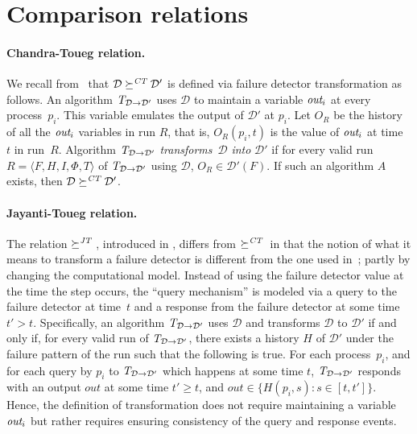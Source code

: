 \documentclass[11pt]{article}
\newcommand{\ident}[1]{\textit{#1}\rule{0cm}{1ex}}
\newcommand{\D}{\mathcal{D}}
\newcommand{\Trans}[1]{\ident{T}_{#1}}
\newcommand{\redCT}{\succeq^\ident{CT}}
\newcommand{\redJT}{\succeq^\ident{JT}}
\begin{document}
\section{Comparison relations}\label{sec:comparisonRelations}

\paragraph{Chandra-Toueg relation.}  

We recall from~\cite{chan:ufdfr,chan:twfdf1} that $\D\redCT\D'$ is
     defined via failure detector transformation as follows.
An  algorithm $\Trans{\D\rightarrow\D'}$ uses $\D$ to maintain a
     variable $\ident{out}_i$ at every process~$p_i$.
This variable emulates the output of $\D'$ at $p_i$.
Let $O_R$ be the history of all the $\ident{out}_i$ variables in run
     $R$, that is, $O_R(p_i,t)$ is the value of $\ident{out}_i$ at
     time~$t$ in run~$R$.
Algorithm $\Trans{\D\rightarrow\D'}$ \emph{transforms}~$\D$
     \emph{into} $\D'$ if for every valid run $R=\langle F, H , I,
     \Phi, T \rangle$ of $\Trans{\D\rightarrow\D'}$ using $\D$,
     $O_R\in \D'(F)$.
If such an algorithm $A$ exists, then $\D\redCT\D'$.

\paragraph{Jayanti-Toueg relation.}  

The relation $\redJT$, introduced in \cite{jayanti:ephawfd}, differs
     from $\redCT$ in that the notion of what it means to transform a
     failure detector is different from the one used
     in~\cite{chan:ufdfr}; partly by changing the computational model.
Instead of using the failure detector value at the time the step
     occurs, the ``query mechanism'' is modeled via a query to the
     failure detector at time~$t$ and a response from the failure
     detector at some time $t'>t$.
Specifically, an algorithm $\Trans{\D\rightarrow\D'}$ uses $\D$ and
     transforms $\D$ to $\D'$ if and only if, for every valid run of
     $\Trans{\D\rightarrow\D'}$, there exists a history $H$ of $\D'$
     under the failure pattern of the run such that the following is
     true.
For each process~$p_i$, and for each query by $p_i$ to
     $\Trans{\D\rightarrow\D'}$ which happens at some time $t$,
     $\Trans{\D\rightarrow\D'}$ responds with an output $out$ at some
     time $t'\geq t$, and $out \in \{H(p_i,s)\colon s \in [t,t']\}$.
Hence, the definition of transformation does not require  maintaining
     a variable $\ident{out}_i$ but rather requires ensuring
     consistency of the query and response events.
\end{document}
